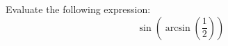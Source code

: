 \documentclass{ximera}
\author{David Kish}
\begin{document}
\begin{exercise}
Evaluate the following expression:
\[
\sin(\arcsin(\frac{1}{2}))
\]
\begin{multipleChoice}
\end{multipleChoice}
\end{exercise}
\end{document}
